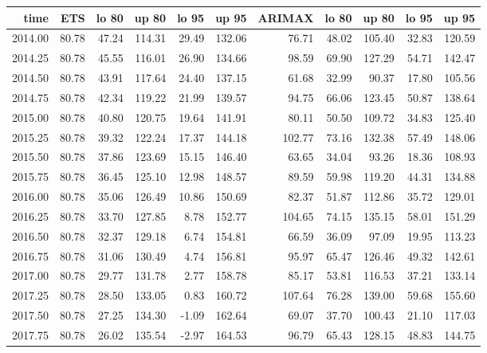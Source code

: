 \documentclass[10pt,a4paper]{article}\usepackage[]{graphicx}\usepackage[]{color}
\begin{document}
\begin{table}[ht]
\centering
\begin{tabular}{rrrrrrrrrrr}
  \hline
time & ETS  & lo 80 & up 80 & lo 95 & up 95 & ARIMAX  & lo 80 & up 80 & lo 95 & up 95 \\ 
  \hline
2014.00 & 80.78 & 47.24 & 114.31 & 29.49 & 132.06 & 76.71 & 48.02 & 105.40 & 32.83 & 120.59 \\ 
  2014.25 & 80.78 & 45.55 & 116.01 & 26.90 & 134.66 & 98.59 & 69.90 & 127.29 & 54.71 & 142.47 \\ 
  2014.50 & 80.78 & 43.91 & 117.64 & 24.40 & 137.15 & 61.68 & 32.99 & 90.37 & 17.80 & 105.56 \\ 
  2014.75 & 80.78 & 42.34 & 119.22 & 21.99 & 139.57 & 94.75 & 66.06 & 123.45 & 50.87 & 138.64 \\ 
  2015.00 & 80.78 & 40.80 & 120.75 & 19.64 & 141.91 & 80.11 & 50.50 & 109.72 & 34.83 & 125.40 \\ 
  2015.25 & 80.78 & 39.32 & 122.24 & 17.37 & 144.18 & 102.77 & 73.16 & 132.38 & 57.49 & 148.06 \\ 
  2015.50 & 80.78 & 37.86 & 123.69 & 15.15 & 146.40 & 63.65 & 34.04 & 93.26 & 18.36 & 108.93 \\ 
  2015.75 & 80.78 & 36.45 & 125.10 & 12.98 & 148.57 & 89.59 & 59.98 & 119.20 & 44.31 & 134.88 \\ 
  2016.00 & 80.78 & 35.06 & 126.49 & 10.86 & 150.69 & 82.37 & 51.87 & 112.86 & 35.72 & 129.01 \\ 
  2016.25 & 80.78 & 33.70 & 127.85 & 8.78 & 152.77 & 104.65 & 74.15 & 135.15 & 58.01 & 151.29 \\ 
  2016.50 & 80.78 & 32.37 & 129.18 & 6.74 & 154.81 & 66.59 & 36.09 & 97.09 & 19.95 & 113.23 \\ 
  2016.75 & 80.78 & 31.06 & 130.49 & 4.74 & 156.81 & 95.97 & 65.47 & 126.46 & 49.32 & 142.61 \\ 
  2017.00 & 80.78 & 29.77 & 131.78 & 2.77 & 158.78 & 85.17 & 53.81 & 116.53 & 37.21 & 133.14 \\ 
  2017.25 & 80.78 & 28.50 & 133.05 & 0.83 & 160.72 & 107.64 & 76.28 & 139.00 & 59.68 & 155.60 \\ 
  2017.50 & 80.78 & 27.25 & 134.30 & -1.09 & 162.64 & 69.07 & 37.70 & 100.43 & 21.10 & 117.03 \\ 
  2017.75 & 80.78 & 26.02 & 135.54 & -2.97 & 164.53 & 96.79 & 65.43 & 128.15 & 48.83 & 144.75 \\ 
   \hline
\end{tabular}
\end{table}
\end{document}
